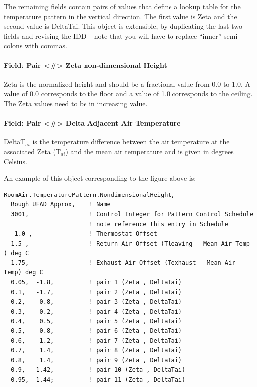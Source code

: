 The remaining fields contain pairs of values that define a lookup table for the temperature pattern in the vertical direction. The first value is Zeta and the second value is DeltaTai. This object is extensible, by duplicating the last two fields and revising the IDD -- note that you will have to replace ``inner'' semi-colons with commas.

\paragraph{Field: Pair \textless{}\#\textgreater{} Zeta non-dimensional Height}\label{field-pair-zeta-non-dimensional-height}

Zeta is the normalized height and should be a fractional value from 0.0 to 1.0. A value of 0.0 corresponds to the floor and a value of 1.0 corresponds to the ceiling. The Zeta values need to be in increasing value.

\paragraph{Field: Pair \textless{}\#\textgreater{} Delta Adjacent Air Temperature}\label{field-pair-delta-adjacent-air-temperature}

DeltaT\(_{ai}\) is the temperature difference between the air temperature at the associated Zeta (T\(_{ai}\)) and the mean air temperature and is given in degrees Celsius.

An example of this object corresponding to the figure above is:

\begin{lstlisting}
RoomAir:TemperaturePattern:NondimensionalHeight,
  Rough UFAD Approx,    ! Name
  3001,                 ! Control Integer for Pattern Control Schedule
                        ! note reference this entry in Schedule
  -1.0 ,                ! Thermostat Offset
  1.5 ,                 ! Return Air Offset (Tleaving - Mean Air Temp ) deg C
  1.75,                 ! Exhaust Air Offset (Texhaust - Mean Air Temp) deg C
  0.05,  -1.8,          ! pair 1 (Zeta , DeltaTai)
  0.1,   -1.7,          ! pair 2 (Zeta , DeltaTai)
  0.2,   -0.8,          ! pair 3 (Zeta , DeltaTai)
  0.3,   -0.2,          ! pair 4 (Zeta , DeltaTai)
  0.4,    0.5,          ! pair 5 (Zeta , DeltaTai)
  0.5,    0.8,          ! pair 6 (Zeta , DeltaTai)
  0.6,    1.2,          ! pair 7 (Zeta , DeltaTai)
  0.7,    1.4,          ! pair 8 (Zeta , DeltaTai)
  0.8,    1.4,          ! pair 9 (Zeta , DeltaTai)
  0.9,   1.42,          ! pair 10 (Zeta , DeltaTai)
  0.95,  1.44;          ! pair 11 (Zeta , DeltaTai)
\end{lstlisting}

